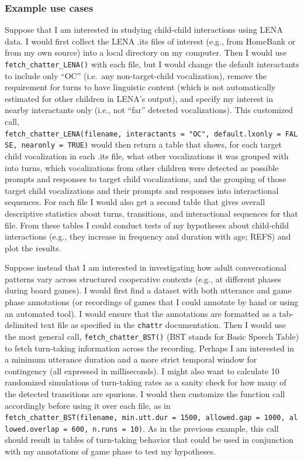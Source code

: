 \documentclass[10pt, letterpaper]{article}
\begin{document}
\hypertarget{example-use-cases}{%
\subsubsection{Example use cases}\label{example-use-cases}}

Suppose that I am interested in studying child-child interactions using
LENA data. I would first collect the LENA .its files of interest (e.g.,
from HomeBank or from my own source) into a local directory on my
computer. Then I would use \texttt{fetch\_chatter\_LENA()} with each
file, but I would change the default interactants to include only ``OC''
(i.e.~any non-target-child vocalization), remove the requirement for
turns to have linguistic content (which is not automatically estimated
for other children in LENA's output), and specify my interest in nearby
interactants only (i.e., not ``far'' detected vocalizations). This
customized call,
\texttt{fetch\_chatter\_LENA(filename,\ interactants\ =\ "OC",\ default.lxonly\ =\ FALSE,\ nearonly\ =\ TRUE)}
would then return a table that shows, for each target child vocalization
in each .its file, what other vocalizations it was grouped with into
turns, which vocalizations from other children were detected as possible
prompts and responses to target child vocalizations, and the grouping of
those target child vocalizations and their prompts and responses into
interactional sequences. For each file I would also get a second table
that gives overall descriptive statistics about turns, transitions, and
interactional sequences for that file. From these tables I could conduct
tests of my hypotheses about child-child interactions (e.g., they
increase in frequency and duration with age; REFS) and plot the results.

Suppose instead that I am interested in investigating how adult
conversational patterns vary across structured cooperative contexts
(e.g., at different phases during board games). I would first find a
dataset with both utterance and game phase annotations (or recordings of
games that I could annotate by hand or using an automated tool). I would
ensure that the annotations are formatted as a tab-delimited text file
as specified in the \texttt{chattr} documentation. Then I would use the
most general call, \texttt{fetch\_chatter\_BST()} (BST stands for Basic
Speech Table) to fetch turn-taking information across the recording.
Perhaps I am interested in a minimum utterance duration and a more
strict temporal window for contingency (all expressed in milliseconds).
I might also want to calculate 10 randomized simulations of turn-taking
rates as a sanity check for how many of the detected transitions are
spurious. I would then customize the function call accordingly before
using it over each file, as in
\texttt{fetch\_chatter\_BST(filename,\ min.utt.dur\ =\ 1500,\ allowed.gap\ =\ 1000,\ allowed.overlap\ =\ 600,\ n.runs\ =\ 10)}.
As in the previous example, this call should result in tables of
turn-taking behavior that could be used in conjunction with my
annotations of game phase to test my hypotheses.
\end{document}
